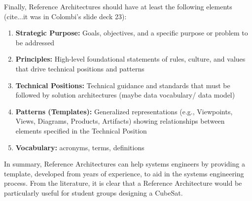 Finally, Reference Architectures should have at least the following elements (cite...it was in Colombi's slide deck 23):
\begin{enumerate}
\item{\textbf{Strategic Purpose:} Goals, objectives, and a specific purpose or problem to be addressed}
\item{\textbf{Principles:} High-level foundational statements of rules, culture, and values that drive  technical positions and patterns}
\item{\textbf{Technical Positions:} Technical guidance and standards that must be followed by solution  architectures (maybe data vocabulary/ data model)}
\item{\textbf{Patterns (Templates):} Generalized representations (e.g., Viewpoints, Views, Diagrams, Products, Artifacts) showing relationships between elements specified in the Technical Position}
\item{\textbf{Vocabulary:} acronyms, terms, definitions}
\end{enumerate}

In summary, Reference Architectures can help systems engineers by providing a template, developed from years of experience, to aid in the systems engineering process. From the literature, it is clear that a Reference Architecture would be particularly useful for student groups designing a CubeSat.

